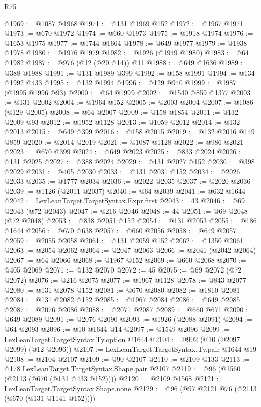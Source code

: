\begin{lexlean}{R75}
\begin{coremodule}
@1969 := @1087 @1968
@1971 := @131 @1969 @152
@1972 := @1967 @1971
@1973 := @670 @1972
@1974 := @660 @1973
@1975 := @1918 @1974
@1976 := @1653 @1975
@1977 := @1744 @1664
@1978 := @649 @1977
@1979 := @1938 @1978
@1980 := @1976 @1979
@1982 := @1926 (@1949 @1980)
@1983 := @64 @1982
@1987 := @976 (@12 (@20 @14)) @11
@1988 := @649 @1636
@1989 := @388 @1988
@1991 := @131 @1989 @399
@1992 := @158 @1991
@1994 := @134 @1992 @433
@1995 := @132 @1994
@1996 := @129 @940
@1999 := @1987 (@1995 @1996 @93)
@2000 := @64 @1999
@2002 := @1540 @859 @1377
@2003 := @131 @2002
@2004 := @1964 @152
@2005 := @2003 @2004
@2007 := @1086 (@129 @2005)
@2008 := @64 @2007
@2009 := @158 @1854
@2011 := @132 @2009 @93
@2012 := @1952 @1128
@2013 := @1059 @2012
@2014 := @132 @2013
@2015 := @649 @399
@2016 := @158 @2015
@2019 := @132 @2016 @149 @859
@2020 := @2014 @2019
@2021 := @1087 @1128
@2022 := @986 @2021
@2023 := @670 @399
@2024 := @649 @2023
@2025 := @833 @2024
@2026 := @131 @2025
@2027 := @388 @2024
@2029 := @131 @2027 @152
@2030 := @398 @2029
@2031 := @405 @2030
@2033 := @131 @2031 @152
@2034 := @2026 @2033
@2035 := @1777 @2034
@2036 := @2022 @2035
@2037 := @2020 @2036
@2039 := @1126 (@2011 @2037)
@2040 := @64 @2039
@2041 := @632 @1644
@2042 := LexLeanTarget.TargetSyntax.Expr.first
@2043 := 43
@2046 := @69 @2043 (@72 @2043)
@2047 := @216 @2046
@2048 := 44
@2051 := @69 @2048 (@72 @2048)
@2053 := @838 @2051 @152
@2054 := @131 @2053
@2055 := @186 @1644
@2056 := @670 @638
@2057 := @660 @2056
@2058 := @649 @2057
@2059 := @2055 @2058
@2061 := @131 @2059 @152
@2062 := @1350 @2061
@2063 := @2054 @2062
@2064 := @2047 @2063
@2066 := @2041 (@2042 @2064)
@2067 := @64 @2066
@2068 := @1967 @152
@2069 := @660 @2068
@2070 := @405 @2069
@2071 := @132 @2070
@2072 := 45
@2075 := @69 @2072 (@72 @2072)
@2076 := @216 @2075
@2077 := @1967 @1128
@2078 := @843 @2077
@2080 := @131 @2078 @152
@2081 := @670 @2080
@2082 := @1810 @2081
@2084 := @131 @2082 @152
@2085 := @1967 @2084
@2086 := @649 @2085
@2087 := @2076 @2086
@2088 := @2071 @2087
@2089 := @660 @671
@2090 := @649 @2089
@2091 := @2076 @2090
@2093 := @1926 (@2088 @2091)
@2094 := @64 @2093
@2096 := @10 @1644 @14
@2097 := @1549 @2096
@2099 := LexLeanTarget.TargetSyntax.Ty.option @1644
@2104 := @902 (@10 (@2097 @2099) (@12 @2096))
@2107 := LexLeanTarget.TargetSyntax.Ty.pair @1644 @19
@2108 := @2104 @2107
@2109 := @90 @2107
@2110 := @2109 @133
@2113 := @178 LexLeanTarget.TargetSyntax.Shape.pair @2107
@2119 := @96 (@1560 (@2113 (@670 (@131 @433 @152))))
@2120 := @2109 @1568
@2121 := LexLeanTarget.TargetSyntax.Shape.none
@2129 := @96 (@97 @2121 @76 (@2113 (@670 (@131 @1141 @152))))

\end{coremodule}
\end{lexlean}
